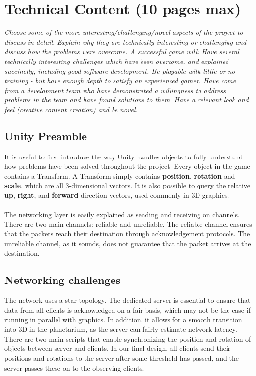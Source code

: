 \documentclass[11pt,a4paper]{article}
\begin{document}
\pagebreak


 \section{Technical Content (10 pages max)}

 \textit{Choose some of the more interesting/challenging/novel aspects of the project to discuss in detail. Explain why they are technically interesting or challenging and discuss how the problems were overcome. A successful game will:
 Have several technically interesting challenges which have been overcome, and explained succinctly, including good software development.
 Be playable with little or no training - but have enough depth to satisfy an experienced gamer.
 Have come from a development team who have demonstrated a willingness to address problems in the team and have found solutions to them.
 Have a relevant look and feel (creative content creation) and be novel.}

 \subsection{Unity Preamble}
 It is useful to first introduce the way Unity handles objects to fully understand how problems have been solved throughout the project. 
 Every object in the game contains a Transform. A Transform simply contains \textbf{position}, \textbf{rotation} and \textbf{scale}, which are all 3-dimensional vectors. It is also possible to query the relative \textbf{up}, \textbf{right}, and \textbf{forward} direction vectors, used commonly in 3D graphics. \\ \\
\noindent
 The networking layer is easily explained as sending and receiving on channels. There are two main channels: reliable and unreliable. The reliable channel ensures that the packets reach their destination through acknowledgement protocols. The unreliable channel, as it sounds, does not guarantee that the packet arrives at the destination.
 
 \subsection{Networking challenges}
  
  \noindent
  The network uses a star topology. The dedicated server is essential to ensure that data from all clients is acknowledged on a fair basis, which may not be the case if running in parallel with graphics. In addition, it allows for a smooth transition into 3D in the planetarium, as the server can fairly estimate network latency. There are two main scripts that enable synchronizing the position and rotation of objects between server and clients. In our final design, all clients send their positions and rotations to the server after some threshold has passed, and the server passes these on to the observing clients.
\end{document}
